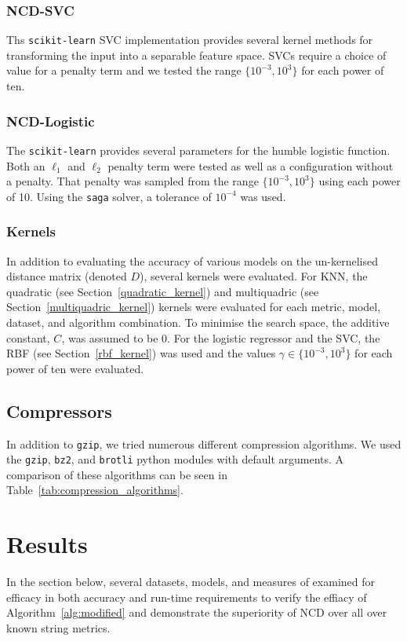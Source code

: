 \documentclass[conference]{IEEEtran}
\begin{document}
\subsubsection{NCD-SVC}
Ths \texttt{scikit-learn} SVC implementation provides several kernel methods for transforming the input into a separable feature space. 
SVCs require a choice of value for a penalty term and we tested the range $\{ 10^{-3}, 10^3 \}$ for each power of ten. 

\subsubsection{NCD-Logistic}
The \texttt{scikit-learn} provides several parameters for the humble logistic function. 
Both an $\ell_1$ and $\ell_2$ penalty term were tested as well as a configuration without a penalty. That penalty was sampled from the range $\{10^{-3}, 10^3\}$ using each power of 10. 
Using the \texttt{saga} solver, a tolerance of $10^{-4}$ was used.

\subsubsection{Kernels}
In addition to evaluating the accuracy of various models on the un-kernelised distance matrix (denoted $D$), several kernels were evaluated.
For KNN, the quadratic (see Section~\ref{quadratic_kernel}) and multiquadric (see Section~\ref{multiquadric_kernel}) kernels were evaluated for each metric, model, dataset, and algorithm combination. 
To minimise the search space, the additive constant, $C$, was assumed to be 0. 
For the logistic regressor and the SVC, the RBF (see Section~\ref{rbf_kernel}) was used and the values $\gamma \in \{10^{-3}, 10^3\}$ for each power of ten were evaluated.

\subsection{Compressors}
\label{compressors}
In addition to \texttt{gzip}, we tried numerous different compression algorithms. We used the \texttt{gzip},  \texttt{bz2}, and \texttt{brotli} python modules with default arguments. A comparison of these algorithms can be seen in Table~\ref{tab:compression_algorithms}.



\section{Results}
\label{results}
In the section below, several datasets, models, and measures of examined for efficacy in both accuracy and run-time requirements to verify the effiacy of Algorithm~\ref{alg:modified} and demonstrate the superiority of NCD over all over known string metrics.
\end{document}
